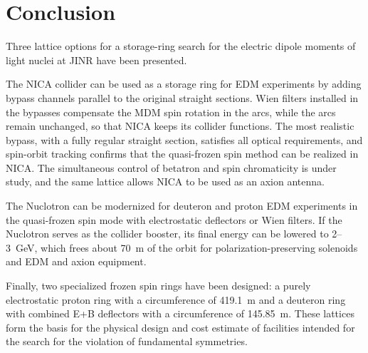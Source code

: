 \section{Conclusion}
\label{sec:conclusion}

Three lattice options for a storage-ring search for the electric dipole
moments of light nuclei at JINR have been presented.

The NICA collider can be used as a storage ring for EDM experiments by adding
bypass channels parallel to the original straight sections. Wien filters
installed in the bypasses compensate the MDM spin rotation in the arcs, while
the arcs remain unchanged, so that NICA keeps its collider functions. The most
realistic bypass, with a fully regular straight section, satisfies all optical
requirements, and spin-orbit tracking confirms that the quasi-frozen spin
method can be realized in NICA. The simultaneous control of betatron and spin
chromaticity is under study, and the same lattice allows NICA to be used as an
axion antenna.

The Nuclotron can be modernized for deuteron and proton EDM experiments in
the quasi-frozen spin mode with electrostatic deflectors or Wien filters. If
the Nuclotron serves as the collider booster, its final energy can be lowered
to 2--\SI{3}{GeV}, which frees about \SI{70}{m} of the orbit for
polarization-preserving solenoids and EDM and axion equipment.

Finally, two specialized frozen spin rings have been designed: a purely
electrostatic proton ring with a circumference of \SI{419.1}{m} and a
deuteron ring with combined E+B deflectors with a circumference of
\SI{145.85}{m}. These lattices form the basis for the physical design and cost
estimate of facilities intended for the search for the violation of
fundamental symmetries.
